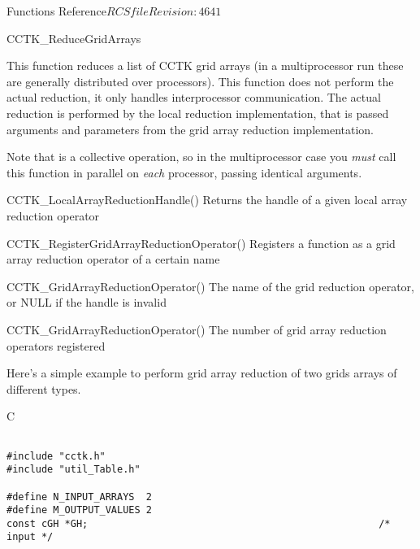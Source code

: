 \begin{cactuspart}{ Functions Reference}{$RCSfile$}{$Revision: 4641 $}
\begin{FunctionDescription}{CCTK\_ReduceGridArrays}
\begin{Discussion}
This function reduces a list of CCTK grid arrays (in a multiprocessor run
these are generally distributed over processors). This function does not perform the actual reduction, it only handles interprocessor communication. The actual reduction is performed by the local reduction implementation, that is passed arguments and parameters
from the grid array reduction implementation.

Note that  is a collective operation, so in the
multiprocessor case you {\em must\/} call this function in parallel on
{\em each\/} processor, passing identical arguments.
\end{Discussion}

\begin{SeeAlsoSection}
\begin{SeeAlso}{CCTK\_LocalArrayReductionHandle()}
Returns the handle of a given local array reduction operator
\end{SeeAlso}

\begin{SeeAlso}{CCTK\_RegisterGridArrayReductionOperator()}
Registers a function as a grid array reduction operator of a certain name
\end{SeeAlso}

\begin{SeeAlso}{CCTK\_GridArrayReductionOperator()}
The name of the grid reduction operator, or NULL if the handle is invalid
\end{SeeAlso}

\begin{SeeAlso}{CCTK\_GridArrayReductionOperator()}
The number of grid array reduction operators registered
\end{SeeAlso}
\end{SeeAlsoSection}

\begin{ExampleSection}
\begin{ExampleDescription}
Here's a simple example to perform grid array reduction of two grids arrays of different types.
\end{ExampleDescription}
\begin{Example}{C}
\begin{verbatim}

#include "cctk.h"
#include "util_Table.h"

#define N_INPUT_ARRAYS  2
#define M_OUTPUT_VALUES 2
const cGH *GH;                                                  /* input */


\end{verbatim}
\end{Example}
\end{ExampleSection}
\end{FunctionDescription}
\end{cactuspart}
